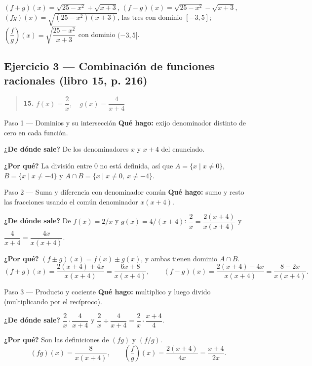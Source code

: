\documentclass[11pt]{article}
\begin{document}
\begin{resp}
$(f+g)(x)=\sqrt{25-x^2}+\sqrt{x+3}$, $(f-g)(x)=\sqrt{25-x^2}-\sqrt{x+3}$, $(fg)(x)=\sqrt{(25-x^2)(x+3)}$, las tres con dominio $[-3,5]$;\\
$\left(\dfrac{f}{g}\right)(x)=\sqrt{\dfrac{25-x^2}{x+3}}$ con dominio $(-3,5]$.
\end{resp}

\subsection*{Ejercicio 3 — Combinación de funciones racionales (libro 15, p. 216)}

\begin{quote}
\textbf{15.} $f(x)=\dfrac{2}{x}, \quad g(x)=\dfrac{4}{x+4}$
\end{quote}

\begin{paso}{Paso 1 --- Dominios y su intersección}
\textbf{Qué hago:} exijo denominador distinto de cero en cada función.

\textbf{¿De dónde sale?} De los denominadores $x$ y $x+4$ del enunciado.

\textbf{¿Por qué?} La división entre $0$ no está definida, así que $A=\{x\mid x\neq 0\}$, $B=\{x\mid x\neq -4\}$ y $A\cap B=\{x\mid x\neq 0,\ x\neq -4\}$.
\end{paso}

\begin{paso}{Paso 2 --- Suma y diferencia con denominador común}
\textbf{Qué hago:} sumo y resto las fracciones usando el común denominador $x(x+4)$.

\textbf{¿De dónde sale?} De $f(x)=2/x$ y $g(x)=4/(x+4)$: $\dfrac{2}{x}=\dfrac{2(x+4)}{x(x+4)}$ y $\dfrac{4}{x+4}=\dfrac{4x}{x(x+4)}$.

\textbf{¿Por qué?} $(f\pm g)(x)=f(x)\pm g(x)$, y ambas tienen dominio $A\cap B$.
\[
(f+g)(x)=\frac{2(x+4)+4x}{x(x+4)}=\frac{6x+8}{x(x+4)},\qquad
(f-g)(x)=\frac{2(x+4)-4x}{x(x+4)}=\frac{8-2x}{x(x+4)} .
\]
\end{paso}

\begin{paso}{Paso 3 --- Producto y cociente}
\textbf{Qué hago:} multiplico y luego divido (multiplicando por el recíproco).

\textbf{¿De dónde sale?} $\dfrac{2}{x}\cdot\dfrac{4}{x+4}$ y $\dfrac{2}{x}\div\dfrac{4}{x+4}=\dfrac{2}{x}\cdot\dfrac{x+4}{4}$.

\textbf{¿Por qué?} Son las definiciones de $(fg)$ y $(f/g)$.
\[
(fg)(x)=\frac{8}{x(x+4)},\qquad \left(\frac{f}{g}\right)(x)=\frac{2(x+4)}{4x}=\frac{x+4}{2x} .
\]
\end{paso}
\end{document}
